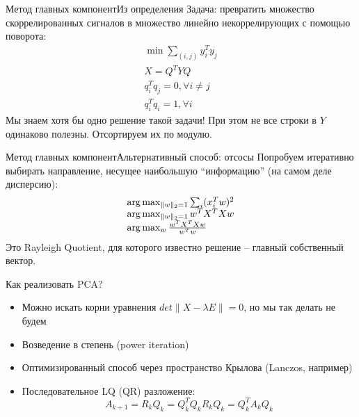 \documentclass[14pt, fleqn, xcolor={dvipsnames, table}]{beamer}
\begin{document}
\begin{frame}{Метод главных компонент}{Из определения}
{\color{blue}Задача:} превратить множество скоррелированных сигналов в множество линейно некоррелирующих с помощью поворота:
$$\begin{array}{l}
\min \sum_{(i,j)} y_i^T y_j \\
X = Q^T Y Q \\
q_i^T q_j = 0, \forall i \ne j \\
q_i^T q_i = 1, \forall i 
\end{array}$$
Мы знаем хотя бы одно решение такой задачи! При этом не все строки в $Y$ одинаково полезны. Отсортируем их по модулю.
\end{frame}

\begin{frame}{Метод главных компонент}{Альтернативный способ: отсосы}
Попробуем итеративно выбирать направление, несущее наибольшую ``информацию'' (на самом деле дисперсию):
$$\begin{array}{l}
\arg \max_{\|w\|_2=1} \sum_i (x_i^Tw)^2 \\
\arg \max_{\|w\|_2=1} w^T X^TXw \\
\arg \max_{w} {w^T X^TXw \over w^Tw} \\
\end{array}$$
Это Rayleigh Quotient, для которого известно решение -- главный собственный вектор.
\end{frame}

\begin{frame}{Как реализовать PCA?}
\begin{itemize}
  \item Можно искать корни уравнения $det\|X - \lambda E\| = 0$, но мы так делать не будем
  \item Возведение в степень (power iteration)
  \item Оптимизированный способ через пространство Крылова (Lanczos, например)
  \item Последовательное LQ (QR) разложение:
$$
A_{k+1} = R_k Q_k = Q_k^TQ_kR_kQ_k=Q_k^TA_kQ_k
$$
\end{itemize}
\end{frame}
\end{document}
